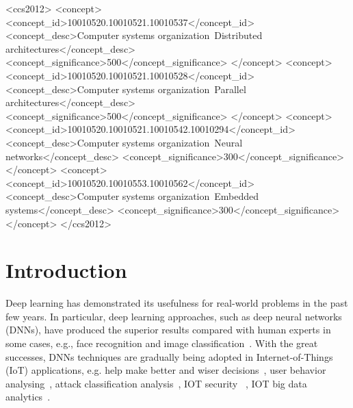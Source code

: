 \documentclass[format=acmsmall, review=false, screen=true]{acmart}
\begin{document}
%
%

\begin{CCSXML}
<ccs2012>
    <concept>
        <concept_id>10010520.10010521.10010537</concept_id>
        <concept_desc>Computer systems organization~Distributed architectures</concept_desc>
        <concept_significance>500</concept_significance>
    </concept>
    <concept>
        <concept_id>10010520.10010521.10010528</concept_id>
        <concept_desc>Computer systems organization~Parallel architectures</concept_desc>
        <concept_significance>500</concept_significance>
    </concept>
    <concept>
        <concept_id>10010520.10010521.10010542.10010294</concept_id>
        <concept_desc>Computer systems organization~Neural networks</concept_desc>
        <concept_significance>300</concept_significance>
    </concept>
    <concept>
        <concept_id>10010520.10010553.10010562</concept_id>
        <concept_desc>Computer systems organization~Embedded systems</concept_desc>
        <concept_significance>300</concept_significance>
    </concept>
</ccs2012>
\end{CCSXML}



%
%


\maketitle



\section{Introduction}
Deep learning has demonstrated its usefulness for real-world problems in the past few years. In particular, deep learning approaches, such as deep neural networks (DNNs), have produced the superior results compared with human experts in some cases, e.g., face recognition and image classification~\cite{Ciregan2012}. With the great successes, DNNs techniques are gradually being adopted in Internet-of-Things (IoT) applications, e.g. help make better and wiser decisions~\cite{LSTMFPGA2017}, user behavior analysing~\cite{Amroun2017}, attack classification analysis~\cite{tamaattack}, IOT security ~\cite{Fekade2017,Kalhara2017,xiao2018iot,Shi2017}, IOT big data analytics~\cite{Mohammadi2018}.
\end{document}
